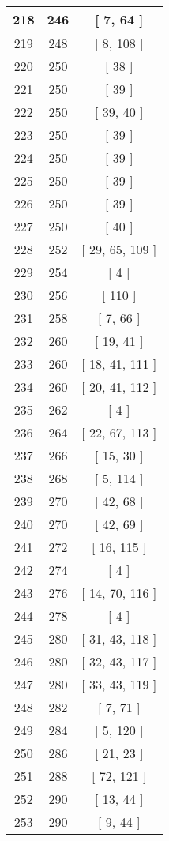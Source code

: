 \begin{center}
\begin{longtable}[H]{|| c c c ||}
\hline
218 & 246 & [ 7, 64 ] \\ 
\hline
219 & 248 & [ 8, 108 ] \\ 
\hline
220 & 250 & [ 38 ] \\ 
\hline
221 & 250 & [ 39 ] \\ 
\hline
222 & 250 & [ 39, 40 ] \\ 
\hline
223 & 250 & [ 39 ] \\ 
\hline
224 & 250 & [ 39 ] \\ 
\hline
225 & 250 & [ 39 ] \\ 
\hline
226 & 250 & [ 39 ] \\ 
\hline
227 & 250 & [ 40 ] \\ 
\hline
228 & 252 & [ 29, 65, 109 ] \\ 
\hline
229 & 254 & [ 4 ] \\ 
\hline
230 & 256 & [ 110 ] \\ 
\hline
231 & 258 & [ 7, 66 ] \\ 
\hline
232 & 260 & [ 19, 41 ] \\ 
\hline
233 & 260 & [ 18, 41, 111 ] \\ 
\hline
234 & 260 & [ 20, 41, 112 ] \\ 
\hline
235 & 262 & [ 4 ] \\ 
\hline
236 & 264 & [ 22, 67, 113 ] \\ 
\hline
237 & 266 & [ 15, 30 ] \\ 
\hline
238 & 268 & [ 5, 114 ] \\ 
\hline
239 & 270 & [ 42, 68 ] \\ 
\hline
240 & 270 & [ 42, 69 ] \\ 
\hline
241 & 272 & [ 16, 115 ] \\ 
\hline
242 & 274 & [ 4 ] \\ 
\hline
243 & 276 & [ 14, 70, 116 ] \\ 
\hline
244 & 278 & [ 4 ] \\ 
\hline
245 & 280 & [ 31, 43, 118 ] \\ 
\hline
246 & 280 & [ 32, 43, 117 ] \\ 
\hline
247 & 280 & [ 33, 43, 119 ] \\ 
\hline
248 & 282 & [ 7, 71 ] \\ 
\hline
249 & 284 & [ 5, 120 ] \\ 
\hline
250 & 286 & [ 21, 23 ] \\ 
\hline
251 & 288 & [ 72, 121 ] \\ 
\hline
252 & 290 & [ 13, 44 ] \\ 
\hline
253 & 290 & [ 9, 44 ] \\ 

\end{longtable}
\end{center}
